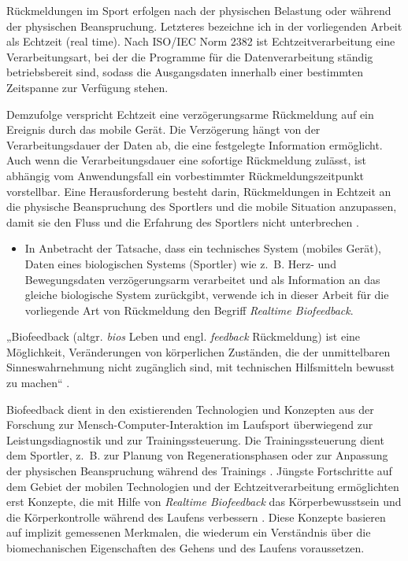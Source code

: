 Rückmeldungen im Sport erfolgen nach der physischen Belastung oder während der physischen Beanspruchung. Letzteres bezeichne ich in der vorliegenden Arbeit als Echtzeit (real time). Nach \ac{IS}O/IEC Norm 2382 ist Echtzeitverarbeitung eine Verarbeitungsart, bei der die Programme für die Datenverarbeitung ständig betriebsbereit sind, sodass die Ausgangsdaten innerhalb einer bestimmten Zeitspanne zur Verfügung stehen.

Demzufolge verspricht Echtzeit eine verzögerungsarme Rückmeldung auf ein Ereignis durch das mobile Gerät. Die Verzögerung hängt von der Verarbeitungsdauer der Daten ab, die eine festgelegte Information ermöglicht. Auch wenn die Verarbeitungsdauer eine sofortige Rückmeldung zulässt, ist abhängig vom Anwendungsfall ein vorbestimmter Rückmeldungszeitpunkt vorstellbar. Eine Herausforderung besteht darin, Rückmeldungen in Echtzeit an die physische Beanspruchung des Sportlers und die mobile Situation anzupassen, damit sie den Fluss und die Erfahrung des Sportlers nicht unterbrechen \citep{Nylander2014}.
\begin{itemize}
	
	\item In Anbetracht der Tatsache, dass ein technisches System (mobiles Gerät), Daten eines biologischen Systems (Sportler) wie z.~B. Herz- und Bewegungsdaten verzögerungsarm verarbeitet und als Information an das gleiche biologische System zurückgibt, verwende ich in dieser Arbeit für die vorliegende Art von Rückmeldung den Begriff \emph{Realtime Biofeedback}.
\end{itemize}

„Biofeedback (altgr. \emph{bios} Leben und engl. \emph{feedback} Rückmeldung) ist eine Möglichkeit, Veränderungen von körperlichen Zuständen, die der unmittelbaren Sinneswahrnehmung nicht zugänglich sind, mit technischen Hilfsmitteln bewusst zu machen“ \citep[][S.~483]{Riemer2015}.

Biofeedback dient in den existierenden Technologien und Konzepten aus der Forschung zur Mensch-Computer-Interaktion im Laufsport überwiegend zur Leistungsdiagnostik und zur Trainingssteuerung. Die Trainingssteuerung dient dem Sportler, z.~B. zur Planung von Regenerationsphasen oder zur Anpassung der physischen Beanspruchung während des Trainings \citep[][S.~81-107]{Marquardt2011}. Jüngste Fortschritte auf dem Gebiet der mobilen Technologien und der Echtzeitverarbeitung ermöglichten erst Konzepte, die mit Hilfe von \emph{Realtime Biofeedback} das Körperbewusstsein und die Körperkontrolle während des Laufens verbessern \citep{Strohrmann2013, Strohrmann2013a, Strohrmann2014}. Diese Konzepte basieren auf implizit gemessenen Merkmalen, die wiederum ein Verständnis über die biomechanischen Eigenschaften des Gehens und des Laufens voraussetzen. 

